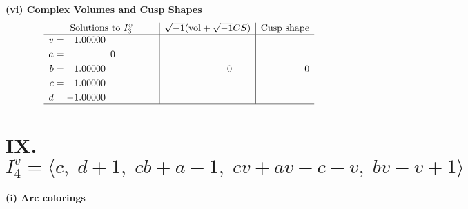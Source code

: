 \documentclass[1p]{elsarticle_modified}
\theoremstyle{definition}
\newcommand{\I}{\sqrt{-1}}
\begin{document}
\newpage\flushleft \textbf{(vi) Complex Volumes and Cusp Shapes}
$$\begin{array}{c|c|c}  
\text{Solutions to }I^v_{3}& \I (\text{vol} + \sqrt{-1}CS) & \text{Cusp shape}\\
 \hline 
\begin{aligned}
v &= \phantom{-}1.00000\phantom{ +0.000000I} \\
a &= \phantom{-0.000000 } 0 \\
b &= \phantom{-}1.00000\phantom{ +0.000000I} \\
c &= \phantom{-}1.00000\phantom{ +0.000000I} \\
d &= -1.00000\phantom{ +0.000000I}\end{aligned}
 & \phantom{-0.000000 } 0 & \phantom{-0.000000 } 0\\
 \hline 
 \end{array}$$\newpage\newpage\renewcommand{\arraystretch}{1}
\centering \section*{IX. $I^v_{4}= \langle c,\;d+1,\;c b+a-1,\;c v+a v- c- v,\;b v- v+1 \rangle$}
\flushleft \textbf{(i) Arc colorings}\\
\end{document}
